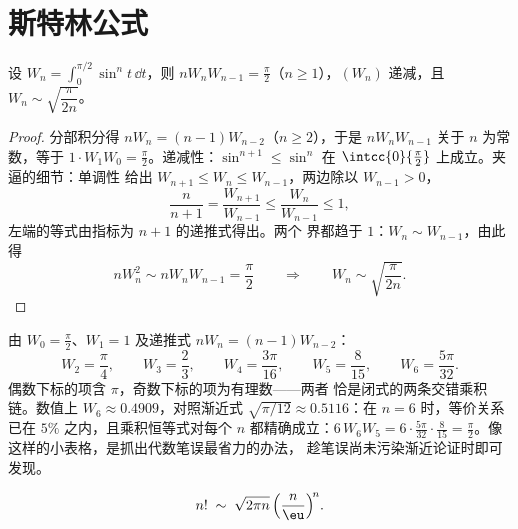 \section{斯特林公式}

\begin{lemma}[沃利斯积分，再探]\label{lem:b2:comparison:wallis}
设 $W_n = \int_0^{\pi/2} \sin^n t\,\dd t$，则 $nW_nW_{n-1} =
\frac\pi2$（$n \geq 1$），$(W_n)$ 递减，且 $W_n \sim
\sqrt{\dfrac{\pi}{2n}}$。
\end{lemma}

\begin{proof}
分部积分得 $nW_n = (n-1)W_{n-2}$（$n \geq 2$），于是
$nW_nW_{n-1}$ 关于 $n$ 为常数，等于 $1 \cdot W_1 W_0 =
\frac\pi2$。递减性：$\sin^{n+1} \leq \sin^n$ 在
$\intcc{0}{\frac\pi2}$ 上成立。夹逼的细节：单调性
给出 $W_{n+1} \leq W_n \leq W_{n-1}$，两边除以 $W_{n-1}
> 0$，
\[
\frac{n}{n+1} = \frac{W_{n+1}}{W_{n-1}} \leq
\frac{W_n}{W_{n-1}} \leq 1 ,
\]
左端的等式由指标为 $n + 1$ 的递推式得出。两个
界都趋于 $1$：$W_n \sim W_{n-1}$，由此得
\[
nW_n^2 \sim nW_nW_{n-1} = \frac\pi2
\qquad\Longrightarrow\qquad
W_n \sim \sqrt{\frac{\pi}{2n}} .
\]
\end{proof}

\begin{example}[最初几个沃利斯积分]\label{ex:b2:comparison:wallisvalues}
由 $W_0 = \frac\pi2$、$W_1 = 1$ 及递推式 $nW_n =
(n-1)W_{n-2}$：
\[
W_2 = \frac\pi4, \qquad
W_3 = \frac23, \qquad
W_4 = \frac{3\pi}{16}, \qquad
W_5 = \frac{8}{15}, \qquad
W_6 = \frac{5\pi}{32}.
\]
偶数下标的项含 $\pi$，奇数下标的项为有理数——两者
恰是闭式的两条交错乘积链。数值上 $W_6
\approx 0.4909$，对照渐近式
$\sqrt{\pi/12} \approx 0.5116$：在 $n = 6$ 时，等价关系
已在 $5\%$ 之内，且乘积恒等式对每个
$n$ 都精确成立：$6\,W_6W_5 = 6\cdot\frac{5\pi}{32}\cdot\frac8{15} =
\frac\pi2$。像这样的小表格，是抓出代数笔误最省力的办法，
趁笔误尚未污染渐近论证时即可发现。
\end{example}

\begin{theorem}[斯特林]\label{thm:b2:comparison:stirling}
\[
n! \;\sim\; \sqrt{2\pi n}\, \Bigl(\frac{n}{\eu}\Bigr)^{\!n}
.\index{斯特林公式}
\]
\end{theorem}

